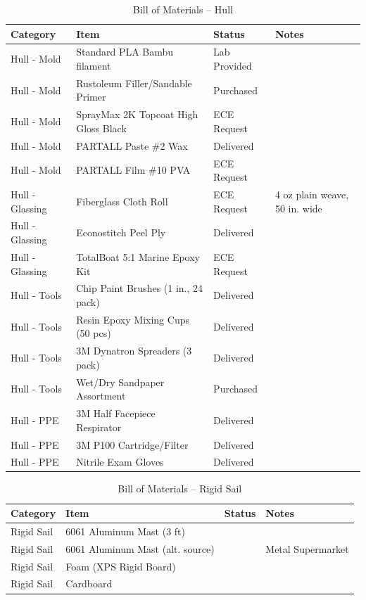 \begin{table}[htbp]
\label{tab:bom_hull}
\centering
\caption{Bill of Materials -- Hull}
\footnotesize
\begin{tabular}{|p{3.45cm}|p{5.5cm}|p{2.2cm}|p{4.75cm}|}
\hline
\textbf{Category} & \textbf{Item} & \textbf{Status} & \textbf{Notes} \\
\hline
Hull - Mold & Standard PLA Bambu filament & Lab Provided & \\
\hline
Hull - Mold & Rustoleum Filler/Sandable Primer & Purchased & \\
\hline
Hull - Mold & SprayMax 2K Topcoat High Gloss Black & ECE Request & \\
\hline
Hull - Mold & PARTALL Paste \#2 Wax & Delivered & \\
\hline
Hull - Mold & PARTALL Film \#10 PVA & ECE Request & \\
\hline
Hull - Glassing & Fiberglass Cloth Roll & ECE Request & 4 oz plain weave, 50 in. wide \\
\hline
Hull - Glassing & Econostitch Peel Ply & Delivered & \\
\hline
Hull - Glassing & TotalBoat 5:1 Marine Epoxy Kit & ECE Request & \\
\hline
Hull - Tools & Chip Paint Brushes (1 in., 24 pack) & Delivered & \\
\hline
Hull - Tools & Resin Epoxy Mixing Cups (50 pcs) & Delivered & \\
\hline
Hull - Tools & 3M Dynatron Spreaders (3 pack) & Delivered & \\
\hline
Hull - Tools & Wet/Dry Sandpaper Assortment & Purchased & \\
\hline
Hull - PPE & 3M Half Facepiece Respirator & Delivered & \\
\hline
Hull - PPE & 3M P100 Cartridge/Filter & Delivered & \\
\hline
Hull - PPE & Nitrile Exam Gloves & Delivered & \\
\hline
\end{tabular}
\end{table}

\begin{table}[htbp]
\label{tab:bom_sail}
\centering
\caption{Bill of Materials -- Rigid Sail}
\footnotesize
\begin{tabular}{|p{3.45cm}|p{5.5cm}|p{2.2cm}|p{4.75cm}|}
\hline
\textbf{Category} & \textbf{Item} & \textbf{Status} & \textbf{Notes} \\
\hline
Rigid Sail & 6061 Aluminum Mast (3 ft) & & \\
\hline
Rigid Sail & 6061 Aluminum Mast (alt. source) & & Metal Supermarket \\
\hline
Rigid Sail & Foam (XPS Rigid Board) & & \\
\hline
Rigid Sail & Cardboard & & \\
\hline
\end{tabular}
\end{table}

